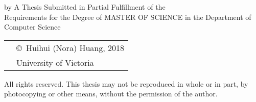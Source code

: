 \pagebreak
{
\centering
\thesistitle
\tpbreak
by
\tpbreak
\nameanddegrees
\tpbreak
A Thesis Submitted in Partial Fulfillment of the \\
Requirements for the Degree of
\tpbreak
MASTER OF SCIENCE
\tpbreak
in the Department of Computer Science\\
\vfill
\begin{tabular}{cl}
& \copyright\ Huihui (Nora) Huang, 2018\\
& \phantom{\copyright} University of Victoria
\end{tabular}
\tpbreak
All rights reserved. This thesis may not be reproduced in whole or in part, by \\
\hfill photocopying or other means, without the permission of the author. 
\hfill
}
\pagebreak
